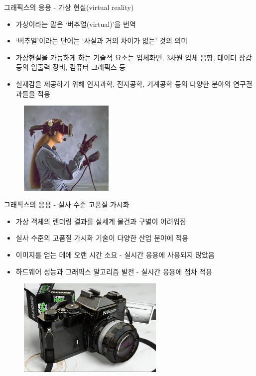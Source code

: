 \documentclass{beamer}
\begin{document}
\begin{frame}{그래픽스의 응용 - 가상 현실(virtual reality)}

\begin{itemize}
\item 가상이라는 말은 ‘버추얼(virtual)’을 번역
\item ‘버추얼’이라는 단어는 ‘사실과 거의 차이가 없는’ 것의 의미
\item 가상현실을 가능하게 하는 기술적 요소는 입체화면, 3차원 입체 음향, 데이터 장갑 등의 입출력 장비,  컴퓨터 그래픽스 등
\item 실재감을 제공하기 위해 인지과학, 전자공학, 기계공학 등의 다양한 분야의 연구결과들을 적용
\end{itemize}

\begin{figure}
    \includegraphics[width=4.5cm]{OGL_intro/virtualRealityHMD.jpg}
\end{figure}

\end{frame}

\begin{frame}{그래픽스의 응용 - 실사 수준 고품질 가시화}

\begin{itemize}
\item 가상 객체의 렌더링 결과를 실세계 물건과 구별이 어려워짐
\item 실사 수준의 고품질 가시화 기술이 다양한 산업 분야에 적용
\item 이미지를 얻는 데에 오랜 시간 소요 - 실시간 응용에 사용되지 않았음
\item 하드웨어 성능과 그래픽스 알고리즘 발전 - 실시간 응용에 점차 적용
\end{itemize}

\begin{figure}
    \includegraphics[width=7cm]{OGL_intro/photorealistic.jpg}
\end{figure}

\end{frame}
\end{document}
